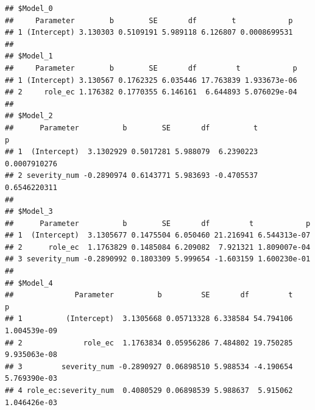 \documentclass[
]{article}
\newenvironment{Shaded}{\begin{snugshade}}{\end{snugshade}}
\newcommand{\AttributeTok}[1]{\textcolor[rgb]{0.13,0.29,0.53}{#1}}
\newcommand{\CommentTok}[1]{\textcolor[rgb]{0.56,0.35,0.01}{\textit{#1}}}
\newcommand{\DecValTok}[1]{\textcolor[rgb]{0.00,0.00,0.81}{#1}}
\newcommand{\FunctionTok}[1]{\textcolor[rgb]{0.13,0.29,0.53}{\textbf{#1}}}
\newcommand{\NormalTok}[1]{#1}
\newcommand{\OtherTok}[1]{\textcolor[rgb]{0.56,0.35,0.01}{#1}}
\newcommand{\SpecialCharTok}[1]{\textcolor[rgb]{0.81,0.36,0.00}{\textbf{#1}}}
\newcommand{\StringTok}[1]{\textcolor[rgb]{0.31,0.60,0.02}{#1}}
\begin{document}
\begin{verbatim}
## $Model_0
##     Parameter        b        SE       df        t            p
## 1 (Intercept) 3.130303 0.5109191 5.989118 6.126807 0.0008699531
## 
## $Model_1
##     Parameter        b        SE       df         t            p
## 1 (Intercept) 3.130567 0.1762325 6.035446 17.763839 1.933673e-06
## 2     role_ec 1.176382 0.1770355 6.146161  6.644893 5.076029e-04
## 
## $Model_2
##      Parameter          b        SE       df          t            p
## 1  (Intercept)  3.1302929 0.5017281 5.988079  6.2390223 0.0007910276
## 2 severity_num -0.2890974 0.6143771 5.983693 -0.4705537 0.6546220311
## 
## $Model_3
##      Parameter          b        SE       df         t            p
## 1  (Intercept)  3.1305677 0.1475504 6.050460 21.216941 6.544313e-07
## 2      role_ec  1.1763829 0.1485084 6.209082  7.921321 1.809007e-04
## 3 severity_num -0.2890992 0.1803309 5.999654 -1.603159 1.600230e-01
## 
## $Model_4
##              Parameter          b         SE       df         t            p
## 1          (Intercept)  3.1305668 0.05713328 6.338584 54.794106 1.004539e-09
## 2              role_ec  1.1763834 0.05956286 7.484802 19.750285 9.935063e-08
## 3         severity_num -0.2890927 0.06898510 5.988534 -4.190654 5.769390e-03
## 4 role_ec:severity_num  0.4080529 0.06898539 5.988637  5.915062 1.046426e-03
\end{verbatim}

\begin{Shaded}
\end{Shaded}
\end{document}
